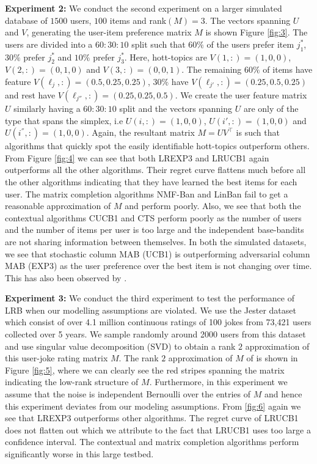 \textbf{Experiment 2:} We conduct the second experiment on a larger simulated database of $1500$ users, $100$ items and rank$(M)=3$. The vectors spanning $U$ and $V$, generating the user-item preference matrix $M$ is shown Figure \ref{fig:3}. The users are divided into a $60:30:10$ split such that $60\%$ of the users prefer item $j^*_1$, $30\%$ prefer $j^*_2$ and $10\%$ prefer $j_3^*$.  Here, hott-topics are $V(1,:) = (1,0,0)$, $V(2,:) = (0,1, 0)$ and $V(3,:) = (0,0,1)$. The remaining $60\%$ of items have feature  $V(\ell_{j},:) = (0.5, 0.25,0.25)$, $30\%$ have $V(\ell_{j'},:) = (0.25, 0.5, 0.25)$ and rest have $V(\ell_{j''},:) = (0.25, 0.25, 0.5)$. We create the user feature matrix $U$ similarly having a $60:30:10$ split and the vectors spanning $U$ are only of the type that spans the simplex, i.e $U(i,:)=(1,0,0)$, $U(i',:)=(1,0,0)$ and $U(i^{''},:)=(1,0,0)$. Again, the resultant matrix $M =UV^{\intercal}$ is such that algorithms that quickly spot the easily identifiable hott-topics outperform others. From Figure \ref{fig:4} we can see that both LREXP3 and LRUCB1 again outperforms all the other algorithms. Their regret curve flattens much before all the other algorithms indicating that they have learned the best items for each user. The matrix completion algorithms NMF-Ban and LinBan fail to get a reasonable approximation of $M$ and perform poorly. Also, we see that both the contextual algorithms CUCB1 and CTS perform poorly as the number of users and the number of items per user is too large and the independent base-bandits are not sharing information between themselves. In both the simulated datasets, we see that stochastic column MAB (UCB1) is outperforming adversarial column MAB (EXP3) as the user preference over the best item is not changing over time. This has also been observed by \citet{radlinski2008learning}.


\textbf{Experiment 3:} We conduct the third experiment to test the performance of LRB when our modelling assumptions are violated. We use the Jester dataset \citep{goldberg2001eigentaste} which consist of over 4.1 million continuous ratings of 100 jokes from 73,421 users collected over 5 years. We sample randomly around 2000 users from this dataset and use singular value decomposition (SVD) to obtain a rank $2$ approximation of this user-joke rating matrix $M$. The rank $2$ approximation of $M$ of  is shown in Figure \ref{fig:5}, where we can clearly see the red stripes spanning the matrix indicating the low-rank structure of $M$. Furthermore, in this experiment we assume that the noise is independent Bernoulli over the entries of $M$ and hence this experiment deviates from our modeling assumptions. From \ref{fig:6} again we see that LREXP3 outperforms other algorithms. The regret curve of LRUCB1 does not flatten out which we attribute to the fact that LRUCB1 uses too large a confidence interval. The contextual and matrix completion algorithms perform significantly worse in this large testbed.



